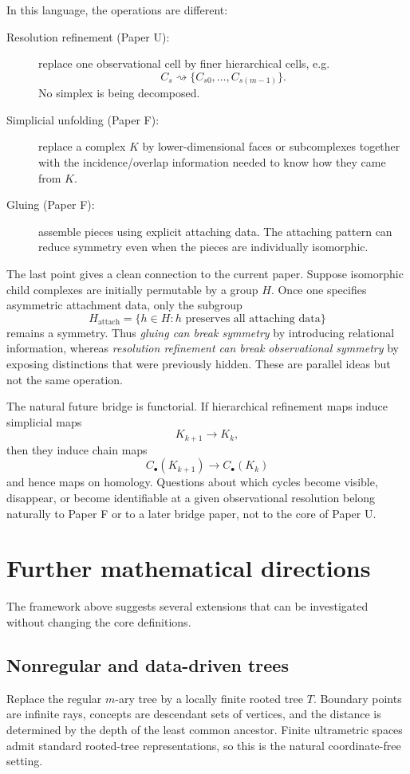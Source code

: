 \documentclass[11pt]{article}
\theoremstyle{definition}
\theoremstyle{remark}
\newcommand{\cyl}[1]{C_{#1}}
\begin{document}
In this language, the operations are different:
\begin{description}
\item[Resolution refinement (Paper U):] replace one observational cell by finer hierarchical cells, e.g.
\[
\cyl{s}\rightsquigarrow\{\cyl{s0},\ldots,\cyl{s(m-1)}\}.
\]
No simplex is being decomposed.
\item[Simplicial unfolding (Paper F):] replace a complex $K$ by lower-dimensional faces or subcomplexes together with the incidence/overlap information needed to know how they came from $K$.
\item[Gluing (Paper F):] assemble pieces using explicit attaching data.  The attaching pattern can reduce symmetry even when the pieces are individually isomorphic.
\end{description}

The last point gives a clean connection to the current paper.  Suppose isomorphic child complexes are initially permutable by a group $H$.  Once one specifies asymmetric attachment data, only the subgroup
\[
H_{\mathrm{attach}}=\{h\in H:h\text{ preserves all attaching data}\}
\]
remains a symmetry.  Thus \emph{gluing can break symmetry} by introducing relational information, whereas \emph{resolution refinement can break observational symmetry} by exposing distinctions that were previously hidden.  These are parallel ideas but not the same operation.

The natural future bridge is functorial.  If hierarchical refinement maps induce simplicial maps
\[
K_{k+1}\to K_k,
\]
then they induce chain maps
\[
C_\bullet(K_{k+1})\to C_\bullet(K_k)
\]
and hence maps on homology.  Questions about which cycles become visible, disappear, or become identifiable at a given observational resolution belong naturally to Paper F or to a later bridge paper, not to the core of Paper U.

\section{Further mathematical directions}

The framework above suggests several extensions that can be investigated without changing the core definitions.

\subsection{Nonregular and data-driven trees}
Replace the regular $m$-ary tree by a locally finite rooted tree $T$.  Boundary points are infinite rays, concepts are descendant sets of vertices, and the distance is determined by the depth of the least common ancestor.  Finite ultrametric spaces admit standard rooted-tree representations, so this is the natural coordinate-free setting.
\end{document}
